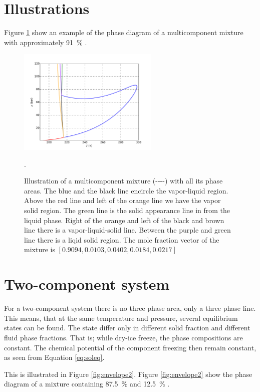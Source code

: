 \documentclass[internal,english]{sintefmemo2012}
\begin{document}
\section{Illustrations}
Figure \ref{fig:envelope} show an example of the phase diagram of a
multicomponent mixture with approximately \SI{91}{\percent} .
\begin{figure}[ht]
  \centering
  \includegraphics[width=0.6\textwidth]{envelope}
  \caption{Illustration of a multicomponent mixture
    (----) with all its phase
    areas. The blue and the black line encircle the vapor-liquid
    region. Above the red line and left of the orange line we have the
    vapor solid region. The green line is the solid appearance line in
    from the liquid phase. Right of the orange and left of the black
    and brown line there is a vapor-liquid-solid line. Between the
    purple and green line there is a liqid solid region. The mole
    fraction vector of the mixture is
    $\left[0.9094,0.0103,0.0402,0.0184,0.0217\right]$}.
  \label{fig:envelope}
\end{figure}

\section{Two-component system}
For a two-component system there is no three phase area, only a three
phase line. This means, that at the same temperature and pressure,
several equilibrium states can be found. The state differ only in
different solid fraction and different fluid phase fractions. That is;
while dry-ice freeze, the phase compositions are constant. The
chemical potential of the component freezing then remain constant, as
seen from Equation \ref{eq:soleq}.

This is illustrated in Figure \ref{fig:envelope2}. Figure
\ref{fig:envelope2} show the phase diagram of a mixture containing
\SI{87.5}{\percent}  and \SI{12.5}{\percent} .
\end{document}
